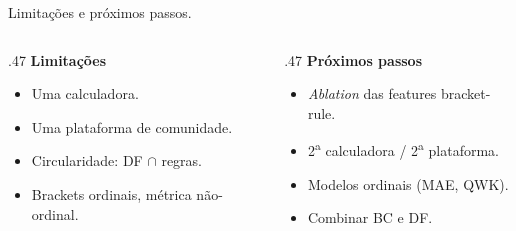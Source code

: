 \documentclass[aspectratio=149, dvipsnames]{beamer}
\begin{document}
\begin{frame}{Limitações e próximos passos.}\pause
    \begin{columns}[t]
        \begin{column}{.47\textwidth}
            \textbf{Limitações}
            \begin{itemize}
                \footnotesize
                \item Uma calculadora.
                \item Uma plataforma de comunidade.
                \item Circularidade: DF $\cap$ regras.
                \item Brackets ordinais, métrica não-ordinal.
            \end{itemize}
        \end{column}%
        \hfill%
        \begin{column}{.47\textwidth}
            \textbf{Próximos passos}
            \begin{itemize}
                \footnotesize
                \item \textit{Ablation} das features bracket-rule.
                \item 2\textsuperscript{a} calculadora / 2\textsuperscript{a} plataforma.
                \item Modelos ordinais (MAE, QWK).
                \item Combinar BC e DF.
            \end{itemize}
        \end{column}
    \end{columns}
\end{frame}
\end{document}
